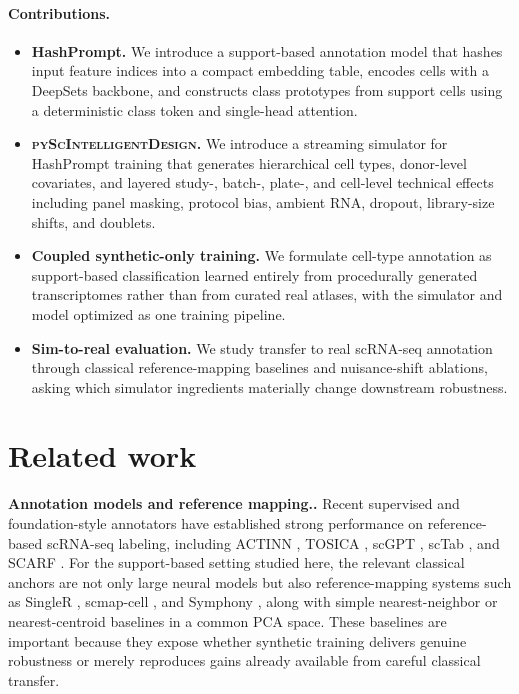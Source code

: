 \documentclass{article}
\newcommand{\myparagraph}[1]{\noindent\textbf{#1.} }
\begin{document}
\paragraph{Contributions.}
\begin{itemize}
    \item \textbf{HashPrompt.} We introduce a support-based annotation model that hashes input feature indices into a compact embedding table, encodes cells with a DeepSets backbone, and constructs class prototypes from support cells using a deterministic class token and single-head attention.
    \item \textbf{\textsc{pyScIntelligentDesign}.} We introduce a streaming simulator for HashPrompt training that generates hierarchical cell types, donor-level covariates, and layered study-, batch-, plate-, and cell-level technical effects including panel masking, protocol bias, ambient RNA, dropout, library-size shifts, and doublets.
    \item \textbf{Coupled synthetic-only training.} We formulate cell-type annotation as support-based classification learned entirely from procedurally generated transcriptomes rather than from curated real atlases, with the simulator and model optimized as one training pipeline.
    \item \textbf{Sim-to-real evaluation.} We study transfer to real scRNA-seq annotation through classical reference-mapping baselines and nuisance-shift ablations, asking which simulator ingredients materially change downstream robustness.
\end{itemize}

\section{Related work}

\myparagraph{Annotation models and reference mapping.}
Recent supervised and foundation-style annotators have established strong performance on reference-based scRNA-seq labeling, including ACTINN \cite{ma2020actinn}, TOSICA \cite{chen2023transformer}, scGPT \cite{cui2024scgpt}, scTab \cite{fischer2024sctab}, and SCARF \cite{liu2025scarf}. For the support-based setting studied here, the relevant classical anchors are not only large neural models but also reference-mapping systems such as SingleR \cite{singleR}, scmap-cell \cite{scmapcell}, and Symphony \cite{symphony}, along with simple nearest-neighbor or nearest-centroid baselines in a common PCA space. These baselines are important because they expose whether synthetic training delivers genuine robustness or merely reproduces gains already available from careful classical transfer.
\end{document}
